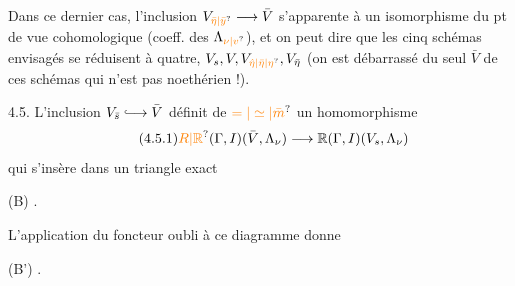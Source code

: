 Dans ce dernier cas,  l'inclusion $V_{\unsure{\bar\eta|\bar y}}\longrightarrow\bar V$ s'apparente à un isomorphisme du pt de vue cohomologique (coeff. des $\Lambda_{\unsure{\nu|v}}$), et on peut dire que les cinq schémas envisagés  \deleted{\unsure{\&}} se réduisent à quatre, $V_s,V,V_{\unsure{\hat\eta|\bar\eta|\eta}},V_{\bar\eta}$ (on est débarrassé du seul $\bar V$ de ces schémas qui n'est pas noethérien !).

4.5. L'inclusion $V_{\bar s}\lhook\joinrel\longrightarrow\bar V$ définit de $\unsure{=|\simeq|\bar m}$ un homomorphisme
\[
\tag*{(4.5.1)}
\unsure{R|\mathbb R}(\Gamma,I)(\bar V,\Lambda_\nu)\longrightarrow\mathbb R(\Gamma,I)(V_s,\Lambda_\nu)
\]
qui s'insère dans un triangle exact

 (B)
.

L'application du foncteur oubli à ce diagramme donne

(B')
.

